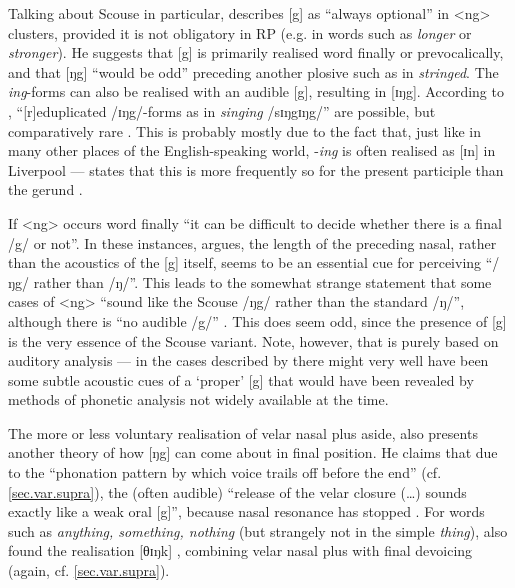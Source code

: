 Talking about Scouse in particular, \citeauthor{knowles1973} describes [g] as ``always optional'' in <ng> clusters, provided it is not obligatory in RP (e.g. in words such as \emph{longer} or \emph{stronger}).
He suggests that [g] is primarily realised word finally or prevocalically, and that [ŋg] ``would be odd'' preceding another plosive such as in \emph{stringed}.
The \emph{ing}-forms can also be realised with an audible [g], resulting in [ɪŋg].
According to \citeauthor{knowles1973}, ``[r]eduplicated /ɪŋg/-forms as in \emph{singing} /sɪŋgɪŋg/'' are possible, but comparatively rare \citep[cf.][293]{knowles1973}.
This is probably mostly due to the fact that, just like in many other places of the English-speaking world, -\emph{ing} is often realised as [ɪn] in Liverpool --- \citeauthor{knowles1973} states that this is more frequently so for the present participle than the gerund \citeyearpar[cf.][156]{knowles1973}.

If <ng> occurs word finally ``it can be difficult to decide whether there is a final /g/ or not''.
In these instances, \citeauthor{knowles1973} argues, the length of the preceding nasal, rather than the acoustics of the [g] itself, seems to be an essential cue for perceiving ``/ŋg/ rather than /ŋ/''.
This leads \citeauthor{knowles1973} to the somewhat strange statement that some cases of <ng> ``sound like the Scouse /ŋg/ rather than the standard /ŋ/'', although there is ``no audible /g/'' \citep[293]{knowles1973}.
This does seem odd, since the presence of [g] is the very essence of the Scouse variant.
Note, however, that \citealt{knowles1973} is purely based on auditory analysis --- in the cases described by \citeauthor{knowles1973} there might very well have been some subtle acoustic cues of a `proper' [g] that would have been revealed by methods of phonetic analysis not widely available at the time.

The more or less voluntary realisation of velar nasal plus aside, \citeauthor{knowles1973} also presents another theory of how [ŋg] can come about in final position.
He claims that due to the ``phonation pattern by which voice trails off before the end'' (cf. \ref{sec.var.supra}), the (often audible) ``release of the velar closure (\ldots) sounds exactly like a weak oral [g]'', because nasal resonance has stopped \citep[cf.][294]{knowles1973}.
For words such as \emph{anything, something, nothing} (but strangely not in the simple \emph{thing}), \citeauthor{knowles1973} also found the realisation [θɪŋk] \citeyearpar[cf.][156]{knowles1973}, combining velar nasal plus with final devoicing (again, cf. \ref{sec.var.supra}).


